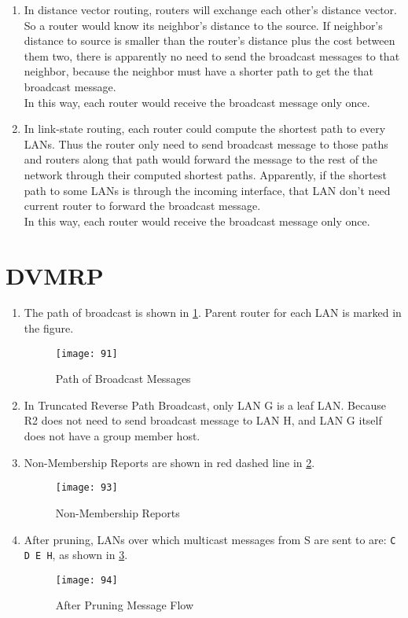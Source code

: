 \documentclass[12pt,titlepage,letterpaper]{article}
\begin{document}
\begin{enumerate}[label=\bfseries\alph*)]
    \item In distance vector routing, routers will exchange each other's
        distance vector. So a router would know its neighbor's distance to the
        source. If neighbor's distance to source is smaller than the router's
        distance plus the cost between them two, there is apparently no need to
        send the broadcast messages to that neighbor, because the neighbor must
        have a shorter path to get the that broadcast message.\\
        In this way, each router would receive the broadcast message only once.
    \item In link-state routing, each router could compute the shortest path to
        every LANs. Thus the router only need to send broadcast message to
        those paths and routers along that path would forward the message to
        the rest of the network through their computed shortest paths.
        Apparently, if the shortest path to some LANs is through the incoming
        interface, that LAN don't need current router to forward the broadcast
        message.\\
        In this way, each router would receive the broadcast message only once.
\end{enumerate}

\section{DVMRP}
\begin{enumerate}[label=\bfseries\roman*.]
    \item The path of broadcast is shown in \cref{91}. Parent router for each
        LAN is marked in the figure.
        \begin{figure}[H]
            \centering
            \caption{Path of Broadcast Messages}\label{91}
            \texttt{[image: 91]}
        \end{figure}
    \item In Truncated Reverse Path Broadcast, only LAN G is a leaf LAN.
        Because R2 does not need to send broadcast message to LAN H, and LAN G
        itself does not have a group member host.\pagebreak
    \item Non-Membership Reports are shown in red dashed line in \cref{93}.
        \begin{figure}[H]
            \centering
            \caption{Non-Membership Reports}\label{93}
            \texttt{[image: 93]}
        \end{figure}
    \item After pruning, LANs over which multicast messages from S are sent to
        are: \texttt{C D E H}, as shown in \cref{94}.
        \begin{figure}[H]
            \centering
            \caption{After Pruning Message Flow}\label{94}
            \texttt{[image: 94]}
        \end{figure}
\end{enumerate}
\end{document}
